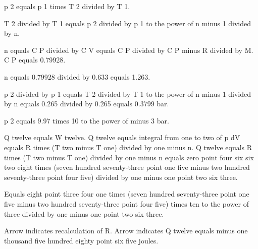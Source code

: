 p 2 equals p 1 times T 2 divided by T 1.  

T 2 divided by T 1 equals p 2 divided by p 1 to the power of n minus 1 divided by n.  

n equals C P divided by C V equals C P divided by C P minus R divided by M.  
C P equals 0.79928.  

n equals 0.79928 divided by 0.633 equals 1.263.  

p 2 divided by p 1 equals T 2 divided by T 1 to the power of n minus 1 divided by n equals 0.265 divided by 0.265 equals 0.3799 bar.  

p 2 equals 9.97 times 10 to the power of minus 3 bar.

Q twelve equals W twelve.  
Q twelve equals integral from one to two of p dV equals R times (T two minus T one) divided by one minus n.  
Q twelve equals R times (T two minus T one) divided by one minus n equals zero point four six six two eight times (seven hundred seventy-three point one five minus two hundred seventy-three point four five) divided by one minus one point two six three.  

Equals eight point three four one times (seven hundred seventy-three point one five minus two hundred seventy-three point four five) times ten to the power of three divided by one minus one point two six three.  

Arrow indicates recalculation of R.  
Arrow indicates Q twelve equals minus one thousand five hundred eighty point six five joules.
